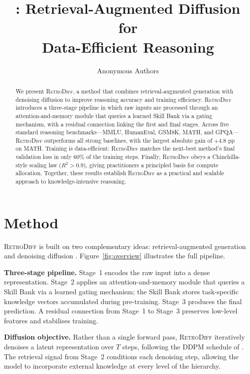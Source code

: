 \documentclass[10pt,twocolumn]{article}
\title{\methodname: Retrieval-Augmented Diffusion for\\Data-Efficient Reasoning}
\author{Anonymous Authors}
\date{}
\newcommand{\methodname}{\textsc{RetroDiff}\xspace}
\begin{document}
\maketitle

\begin{abstract}
We present \methodname, a method that combines retrieval-augmented generation
with denoising diffusion to improve reasoning accuracy and training efficiency.
\methodname introduces a three-stage pipeline in which raw inputs are processed
through an attention-and-memory module that queries a learned Skill Bank via a
gating mechanism, with a residual connection linking the first and final stages.
Across five standard reasoning benchmarks---MMLU, HumanEval, GSM8K, MATH, and
GPQA---\methodname outperforms all strong baselines, with the largest absolute
gain of $+4.8$ pp on MATH.  Training is data-efficient: \methodname matches the
next-best method's final validation loss in only 60\% of the training steps.
Finally, \methodname obeys a Chinchilla-style scaling law ($R^{2}>0.9$), giving
practitioners a principled basis for compute allocation.  Together, these
results establish \methodname as a practical and scalable approach to
knowledge-intensive reasoning.
\end{abstract}

\section{Method}
\label{sec:method}

\methodname is built on two complementary ideas: retrieval-augmented generation
\cite{zhang2024retrieval} and denoising diffusion \cite{ho2020denoising}.
Figure~\ref{fig:overview} illustrates the full pipeline.

\noindent\textbf{Three-stage pipeline.}
Stage~1 encodes the raw input into a dense representation.  Stage~2 applies an
attention-and-memory module that queries a Skill Bank via a learned gating
mechanism; the Skill Bank stores task-specific knowledge vectors accumulated
during pre-training.  Stage~3 produces the final prediction.  A residual
connection from Stage~1 to Stage~3 preserves low-level features and stabilises
training.

\noindent\textbf{Diffusion objective.}
Rather than a single forward pass, \methodname iteratively denoises a latent
representation over $T$ steps, following the DDPM schedule of
\citet{ho2020denoising}.  The retrieval signal from Stage~2 conditions each
denoising step, allowing the model to incorporate external knowledge at every
level of the hierarchy.
\end{document}
